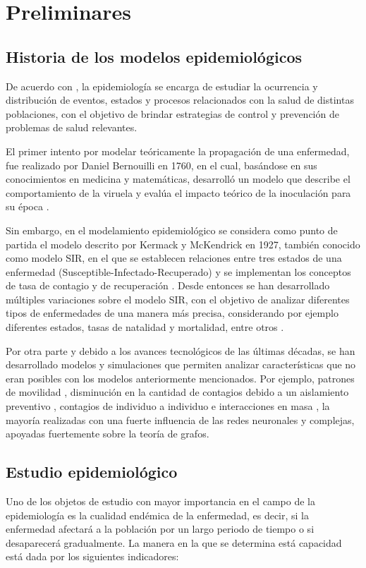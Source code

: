 \chapter{Preliminares}\label{ch:Preliminares}
\section{Historia de los modelos epidemiológicos}\label{sec:Historia de la epidemiología}
De acuerdo con \cite{epiDictionary}, la epidemiología se encarga de estudiar la ocurrencia y distribución de eventos, estados y procesos relacionados con la salud de distintas poblaciones, con el objetivo de brindar estrategias de control y prevención de problemas de salud relevantes.

El primer intento por modelar teóricamente la propagación de una enfermedad, fue realizado por Daniel Bernouilli en 1760, en el cual, basándose en sus conocimientos en medicina y matemáticas, desarrolló un modelo que describe el comportamiento de la viruela y evalúa el impacto teórico de la inoculación para su época \cite{shortHistory}. 

Sin embargo, en el modelamiento epidemiológico se considera como punto de partida el modelo descrito por Kermack y McKendrick en 1927, también conocido como modelo SIR, en el que se establecen relaciones entre tres estados de una enfermedad (Susceptible-Infectado-Recuperado) y se implementan los conceptos de tasa de contagio y de recuperación \cite{malariaSIR}. Desde entonces se han desarrollado múltiples variaciones sobre el modelo SIR, con el objetivo de analizar diferentes tipos de enfermedades de una manera más precisa, considerando por ejemplo diferentes estados, tasas de natalidad y mortalidad, entre otros \cite{diego2010}.

Por otra parte y debido a los avances tecnológicos de las últimas décadas, se han desarrollado modelos y simulaciones que permiten analizar características que no eran posibles con los modelos anteriormente mencionados. Por ejemplo, patrones de movilidad \cite{colaGNN, epidemiologicalNeuralNetwork}, disminución en la cantidad de contagios debido a un aislamiento preventivo \cite{stayHome}, contagios de individuo a individuo \cite{heterogeneousPopulation} e interacciones en masa \cite{combiningGraph, transfer2021}, la mayoría realizadas con una fuerte influencia de las redes neuronales y complejas, apoyadas fuertemente sobre la teoría de grafos.

\section{Estudio epidemiológico}\label{sec:Estudio epidemiológico}
Uno de los objetos de estudio con mayor importancia en el campo de la epidemiología es la cualidad endémica de la enfermedad, es decir, si la enfermedad afectará a la población por un largo periodo de tiempo o si desaparecerá gradualmente. La manera en la que se determina está capacidad está dada por los siguientes indicadores:

